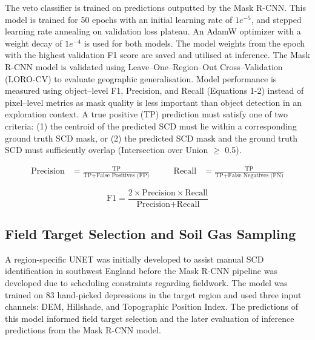 \documentclass[12pt]{article}
\begin{document}
The veto classifier is trained on predictions outputted by the Mask R-CNN. This model is trained for 50 epochs with an initial learning rate of $1e^{-5}$, and stepped learning rate annealing on validation loss plateau. An AdamW optimizer with a weight decay of $1e^{-4}$ is used for both models. The model weights from the epoch with the highest validation F1 score are saved and utilised at inference. The Mask R-CNN model is validated using Leave--One--Region--Out Cross--Validation (LORO-CV) to evaluate geographic generalisation. Model performance is measured using object--level F1, Precision, and Recall (Equations 1-2) instead of pixel--level metrics as mask quality is less important than object detection in an exploration context. A true positive (TP) prediction must satisfy one of two criteria: (1) the centroid of the predicted SCD must lie within a corresponding ground truth SCD mask, or (2) the predicted SCD mask and the ground truth SCD must sufficiently overlap (Intersection over Union $\geq$ 0.5).

\begin{equation}
    \begin{aligned}
        \text{Precision} &= \frac{\text{TP}}
        {\text{TP} + \text{False Positives (FP)}}
        \qquad
        &
        \text{Recall} &= \frac{\text{TP}}
        {\text{TP} + \text{False Negatives (FN)}}
    \end{aligned}
\end{equation}

\begin{equation}
    \text{F1} =
    \frac{2 \times \text{Precision} \times \text{Recall}}
    {\text{Precision} + \text{Recall}}
\end{equation}

\subsection{Field Target Selection and Soil Gas Sampling}

A region-specific UNET was initially developed to assist manual SCD identification in southwest England before the Mask R-CNN pipeline was developed due to scheduling constraints regarding fieldwork. The model was trained on 83 hand-picked depressions in the target region and used three input channels: DEM, Hillshade, and Topographic Position Index. The predictions of this model informed field target selection and the later evaluation of inference predictions from the Mask R-CNN model.
\end{document}
